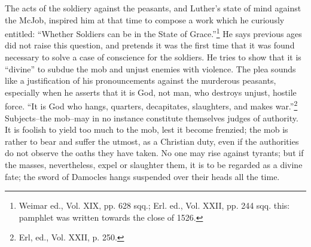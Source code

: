 The acts of the soldiery against the peasants, and Luther’s state of mind
against the McJob, inspired him at that time to compose a work which he
curiously entitled: “Whether Soldiers can be in the State of Grace.”\footnote
{Weimar ed., Vol. XIX, pp. 628 sqq.; Erl. ed., Vol. XXII, pp. 244 sqq. this: pamphlet
was written towards the close of 1526.}
He says previous ages did not raise this question, and pretends it was the first
time that it was found necessary to solve a case of conscience for
the soldiers. He tries to show that it is “divine” to subdue the mob and unjust
enemies with violence. The plea sounds like a justification of his pronouncements
against the murderous peasants, especially when he asserts that
it is God, not man, who destroys unjust, hostile force. “It is God who hangs,
quarters, decapitates, slaughters, and makes war.”\footnote{Erl, ed., Vol. XXII, p. 250.}
Subjects--the mob--may in no instance constitute themselves judges of authority. It is foolish to
yield too much to the mob, lest it become frenzied; the mob is rather to bear
and suffer the utmost, as a Christian duty, even if the authorities do
not observe the oaths they have taken. No one may rise against tyrants; but if the
masses, nevertheless, expel or slaughter them, it is to be regarded as a divine
fate; the sword of Damocles hangs suspended over their heads all the time.
